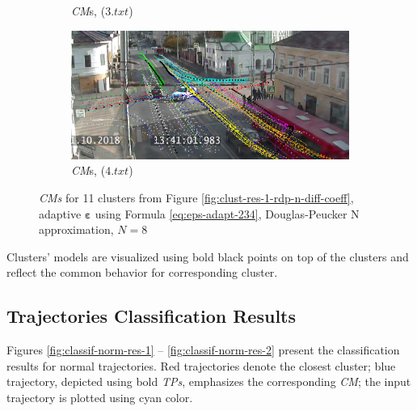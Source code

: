 \begin{figure}[!htb]
\begin{subfigure}[!htb]{0.23\textwidth}
		\caption{\textit{CM}s, ($3.txt$)}
		\label{fig:cm-res-1-rdp-n-diff-coeff-3}
	\end{subfigure}
	\hfill
	\begin{subfigure}[!htb]{0.23\textwidth}
		\centering{}
		\includegraphics[width=\textwidth]{images/cm-res/cm-res-1-rdp-n-diff-coeff-4.png}
		\caption{\textit{CM}s, ($4.txt$)}
		\label{fig:cm-res-1-rdp-n-diff-coeff-4}
	\end{subfigure}
	\caption{\textit{CMs} for 11 clusters from Figure \ref{fig:clust-res-1-rdp-n-diff-coeff}, adaptive $\bm{\varepsilon}$ using Formula \ref{eq:eps-adapt-234}, Douglas-Peucker N approximation, $N = 8$}
	\label{fig:cm-res-rdp-n-diff-coeff}
\end{figure}

Clusters' models are visualized using bold black points on top of the clusters and reflect the common behavior for corresponding cluster.

\subsection{Trajectories Classification Results}

Figures \ref{fig:classif-norm-res-1} -- \ref{fig:classif-norm-res-2} present the classification results for normal trajectories. Red trajectories denote the closest cluster; blue trajectory, depicted using bold \textit{TPs}, emphasizes the corresponding \textit{CM}; the input trajectory is plotted using cyan color.

